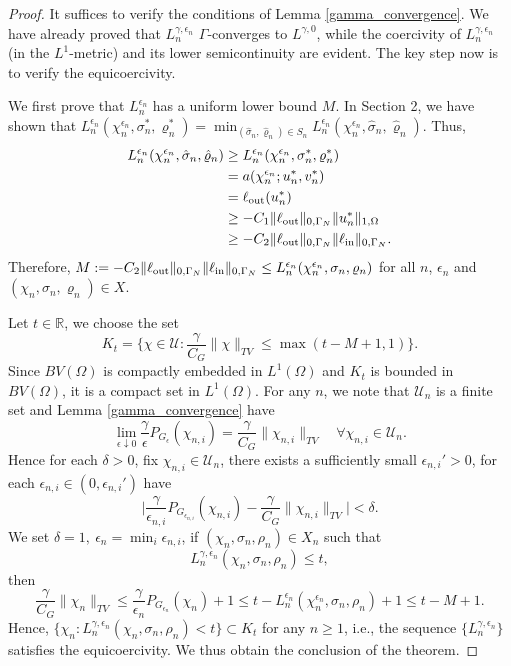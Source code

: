 \documentclass{amsart}
\begin{document}
\begin{proof}
    It suffices to verify the conditions of Lemma \ref{gamma_convergence}. We have already proved that $L_n^{\gamma,\epsilon_n}$ $ \Gamma  $-converges to $L^{\gamma,0}$, while the coercivity of $L_n^{\gamma,\epsilon_n} $ (in the $L^1$-metric) and its lower semicontinuity are evident. The key step now is to verify the equicoercivity. 
    
    We first prove that \( L_n^{\epsilon_n} \) has a uniform lower bound \( M \). In Section 2, we have shown that \(L_n^{\epsilon_n}(\chi_n^{\epsilon_n}, \sigma_n^*, \varrho_n^*)=\min_{(\hat\sigma_n, \hat\varrho_n) \in S_n} L_n^{\epsilon_n}(\chi_n^{\epsilon_n}, \hat\sigma_n, \hat\varrho_n) \).  Thus, 
    \begin{align*}
        L_n^{\epsilon_n}(\chi_n^{\epsilon_n}, \hat\sigma_n, \hat\varrho_n)&\geq L_n^{\epsilon_n}(\chi_n^{\epsilon_n}, \sigma_n^*, \varrho_n^*)\\
        &=a(\chi_n^{\epsilon_n};u_n^*,v_n^*)\\
        &=\ell_{\rm out}(u_n^*)\\
        &\geq -C_1\|\ell_{\rm out}\|_{0,\Gamma_N}\|u_n^*\|_{1,\Omega}\\
        &\geq -C_2 \|\ell_{\rm out}\|_{0,\Gamma_N}\|\ell_{\rm in}\|_{0,\Gamma_N}.
    \end{align*}
    Therefore, \( M := -C_2 \|\ell_{\rm out}\|_{0,\Gamma_N}\|\ell_{\rm in}\|_{0,\Gamma_N} \leq L_n^{\epsilon_n}(\chi_n^{\epsilon_n}, \sigma_n, \varrho_n) \) for all $n$, $\epsilon_n$ and  $(\chi_n, \sigma_n, \varrho_n) \in X$.
    
    Let $t \in \mathbb{R}$, we choose the set $$   K_t = \Big\{ \chi \in \mathcal{U} : \dfrac{\gamma}{C_G}\|\chi\|_{TV} \leq \max(t-M+1,1)\Big\}.$$ 
    Since $BV(\Omega)$ is compactly embedded in $L^1(\Omega)$ and $K_t$ is bounded in $BV(\Omega)$, it is a compact set in $L^1(\Omega)$. For any $n$, we note that $\mathcal{U}_n $ is a finite set and Lemma \ref{gamma_convergence} have
        $$\lim_{\epsilon\downarrow 0 }\dfrac{\gamma}{\epsilon} P_{G_{\epsilon}}(\chi_{n,i}) = \dfrac{\gamma}{C_G}\|\chi_{n,i}\|_{TV}\quad \forall \chi_{n,i}\in \mathcal{U}_n.$$
    Hence for each $\delta>0$, fix $\chi_{n,i}\in \mathcal{U}_n$, there exists a sufficiently small $\epsilon_{n,i}'>0$, for each $\epsilon_{n,i}\in (0,\epsilon_{n,i}')$ have
    $$\Big|\dfrac{\gamma}{\epsilon_{n,i}} P_{G_{\epsilon_{n,i}}}(\chi_{n,i}) - \dfrac{\gamma}{C_G}\|\chi_{n,i}\|_{TV}\Big| <\delta. $$
    We set $\delta = 1,\ \epsilon_n = \min_i \epsilon_{n,i}$, if \((\chi_n,\sigma_n,\rho_n)\in X_n\) such that
    $$L_n^{\gamma,\epsilon_n}(\chi_n,\sigma_n,\rho_n)\leq t,$$
    then 
    $$ \dfrac{\gamma}{C_G}\|\chi_n\|_{TV}\leq \dfrac{\gamma}{\epsilon_n}P_{G_{\epsilon_n}}(\chi_n)+1\leq t-L_n^{\epsilon_n}(\chi_n^{\epsilon_n},\sigma_n,\rho_n)+1\leq t-M+1.
    $$
    Hence, $\{\chi_n: L_n^{\gamma,\epsilon_n}(\chi_n,\sigma_n,\rho_n)<t\}\subset K_t$ for any $n\geq 1$, i.e., the sequence $\{L_n^{\gamma,\epsilon_n}\}$ satisfies the equicoercivity. We thus obtain the conclusion of the theorem. 
\end{proof}
\end{document}
